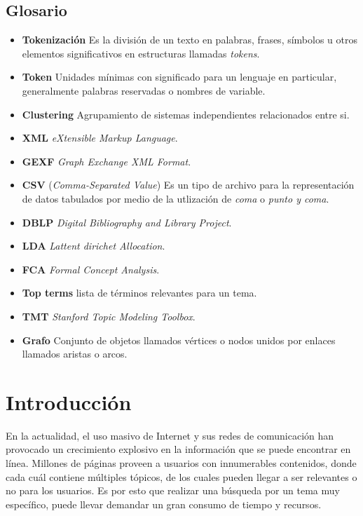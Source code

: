 \documentclass[12pt,oneside,letterpaper]{book}
\newcommand{\gli}[2]{\item{\textbf{#1} #2}} %
\newcommand{\eng}[1]{\textit{#1}\xspace}			%
\theoremstyle{definition}
\begin{document}
\section*{Glosario}
\thispagestyle{empty}
\begin{itemize}
	\gli{Tokenización}{Es la división de un texto en palabras, frases, símbolos u otros elementos significativos en estructuras llamadas \eng{tokens}.}
	\gli{Token}{Unidades mínimas con significado para un lenguaje en particular, generalmente palabras reservadas o nombres de variable.}
	\gli{Clustering}{Agrupamiento de sistemas independientes relacionados entre si.}
	\gli{XML}{\eng{eXtensible Markup Language}.}
	\gli{GEXF}{\eng{Graph Exchange XML Format}.}
	\gli{CSV}{(\eng{Comma-Separated Value}) Es un tipo de archivo para la representación de datos tabulados por medio de la utlización de \eng{coma} o \eng{punto y coma}.}
	\gli{DBLP}{\eng{Digital Bibliography and Library Project}.}
	\gli{LDA}{\eng{Lattent dirichet Allocation}.}
	\gli{FCA}{\eng{Formal Concept Analysis}.}
	\gli{Top terms}{lista de términos relevantes para un tema.}
	\gli{TMT}{\eng{Stanford Topic Modeling Toolbox}.}
	\gli{Grafo}{Conjunto de objetos llamados vértices o nodos unidos por enlaces llamados aristas o arcos.}
\end{itemize}
\clearpage


\tableofcontents
\clearpage


\endgroup
\setcounter{page}{1}
\chapter{Introducción}
En la actualidad, el uso masivo de Internet y sus redes de comunicación han provocado un crecimiento explosivo en la información que se puede encontrar en línea. Millones de páginas proveen a usuarios con innumerables contenidos, donde cada cuál contiene múltiples tópicos, de los cuales pueden llegar a ser relevantes o no para los usuarios. Es por esto que realizar una búsqueda por un tema muy específico, puede llevar demandar un gran consumo de tiempo y recursos.
\end{document}
